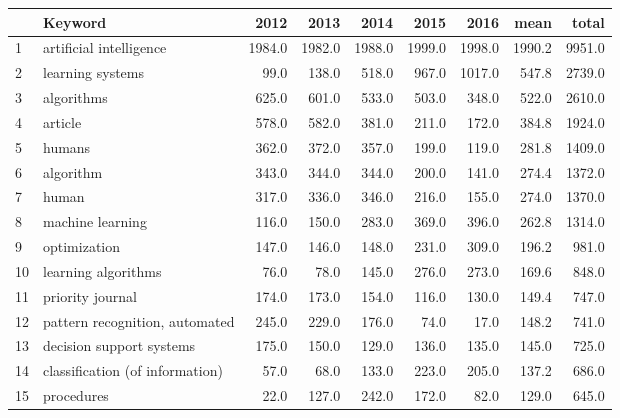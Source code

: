 \begin{tabular}{llrrrrrrr}
\toprule
{} &                                  Keyword &    2012 &    2013 &    2014 &    2015 &    2016 &    mean &   total \\
\midrule
1  &                  artificial intelligence &  1984.0 &  1982.0 &  1988.0 &  1999.0 &  1998.0 &  1990.2 &  9951.0 \\
2  &                         learning systems &    99.0 &   138.0 &   518.0 &   967.0 &  1017.0 &   547.8 &  2739.0 \\
3  &                               algorithms &   625.0 &   601.0 &   533.0 &   503.0 &   348.0 &   522.0 &  2610.0 \\
4  &                                  article &   578.0 &   582.0 &   381.0 &   211.0 &   172.0 &   384.8 &  1924.0 \\
5  &                                   humans &   362.0 &   372.0 &   357.0 &   199.0 &   119.0 &   281.8 &  1409.0 \\
6  &                                algorithm &   343.0 &   344.0 &   344.0 &   200.0 &   141.0 &   274.4 &  1372.0 \\
7  &                                    human &   317.0 &   336.0 &   346.0 &   216.0 &   155.0 &   274.0 &  1370.0 \\
8  &                         machine learning &   116.0 &   150.0 &   283.0 &   369.0 &   396.0 &   262.8 &  1314.0 \\
9  &                             optimization &   147.0 &   146.0 &   148.0 &   231.0 &   309.0 &   196.2 &   981.0 \\
10 &                      learning algorithms &    76.0 &    78.0 &   145.0 &   276.0 &   273.0 &   169.6 &   848.0 \\
11 &                         priority journal &   174.0 &   173.0 &   154.0 &   116.0 &   130.0 &   149.4 &   747.0 \\
12 &           pattern recognition, automated &   245.0 &   229.0 &   176.0 &    74.0 &    17.0 &   148.2 &   741.0 \\
13 &                 decision support systems &   175.0 &   150.0 &   129.0 &   136.0 &   135.0 &   145.0 &   725.0 \\
14 &          classification (of information) &    57.0 &    68.0 &   133.0 &   223.0 &   205.0 &   137.2 &   686.0 \\
15 &                               procedures &    22.0 &   127.0 &   242.0 &   172.0 &    82.0 &   129.0 &   645.0 \\

\end{tabular}
